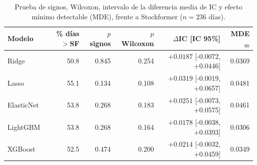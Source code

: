 \begin{table}[htbp]
\centering
\caption{Prueba de signos, Wilcoxon, intervalo de la diferencia media de IC y efecto
m\'inimo detectable (MDE), frente a Stockformer ($n=236$ d\'ias).}
\label{tab:power-signtest}
\small
\begin{tabular}{lrrrrr}
\toprule
Modelo & \% d\'ias $>$SF & $p$ signos & $p$ Wilcoxon & $\Delta$IC [IC 95\%] & MDE$_{80}$ \\
\midrule
Ridge & 50.8 & 0.845 & 0.254 & $+0.0187$ [-0.0072, +0.0446] & 0.0369 \\
Lasso & 55.1 & 0.134 & 0.108 & $+0.0319$ [-0.0019, +0.0657] & 0.0481 \\
ElasticNet & 53.8 & 0.268 & 0.183 & $+0.0251$ [-0.0073, +0.0575] & 0.0461 \\
LightGBM & 53.8 & 0.268 & 0.164 & $+0.0178$ [-0.0038, +0.0393] & 0.0306 \\
XGBoost & 52.5 & 0.474 & 0.200 & $+0.0214$ [-0.0032, +0.0459] & 0.0349 \\
\bottomrule
\end{tabular}
\end{table}

